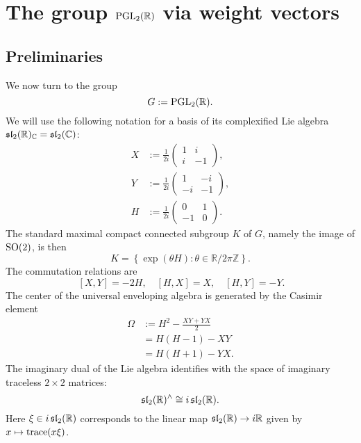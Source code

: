 \documentclass[reqno]{amsart} 
\numberwithin{equation}{section}
\begin{document}
\section{The group $\operatorname{PGL}_2(\mathbb{R})$ via weight vectors}\label{sec:d1a9162eb3c7}
\subsection{Preliminaries}\label{sec:d1a915ba8ec6}
We now turn to the group
\begin{equation*}
  G := \operatorname{PGL}_2(\mathbb{R}).
\end{equation*}
We will use the following notation for a basis of its complexified Lie algebra $\mathfrak{sl}_2(\mathbb{R})_{\mathbb{C}} = \operatorname{\mathfrak{s}\mathfrak{l}}_2(\mathbb{C})$:
\begin{align*}
  X &:= \frac{1}{2 i}
      \begin{pmatrix}
        1 & i  \\
        i & -1
      \end{pmatrix},
  \\
  Y &:= \frac{1}{2 i}
      \begin{pmatrix}
        1  & -i \\
        -i & -1
      \end{pmatrix},
  \\
  H &:= \frac{1}{2 i}
      \begin{pmatrix}
        0  & 1 \\
        -1 & 0
      \end{pmatrix}.
\end{align*}
The standard maximal compact connected subgroup $K$ of $G$, namely the image of $\operatorname{SO}(2)$, is then
\begin{equation*}
  K = \left\{ \exp(\theta H) : \theta \in \mathbb{R} / 2 \pi \mathbb{Z}  \right\}.
\end{equation*}
The commutation relations are
\begin{equation*}
  ~
  [X,Y] = - 2 H,  \quad
  [H,X] = X,
  \quad
  [H,Y] = -Y.
\end{equation*}
The center of the universal enveloping algebra is generated by the Casimir element
\begin{align*}
  \Omega &:= H^2 - \frac{X Y + Y X}{2} \\
         &= H(H-1) - X Y \\
         &= H(H+1) - Y X.
\end{align*}
The imaginary dual of the Lie algebra identifies with the space of imaginary traceless $2 \times 2$ matrices:
\begin{equation}\label{eqn:d1a9150ab652}
  \operatorname{\mathfrak{s}\mathfrak{l}}_2(\mathbb{R})^\wedge \cong i \operatorname{\mathfrak{s}\mathfrak{l}}_2(\mathbb{R}).
\end{equation}
Here $\xi \in i \operatorname{\mathfrak{s}\mathfrak{l}}_2(\mathbb{R})$ corresponds to the linear map $\operatorname{\mathfrak{s}\mathfrak{l}}_2(\mathbb{R}) \rightarrow i \mathbb{R} $ given by $x \mapsto \operatorname{trace}(x \xi)$.
\end{document}
